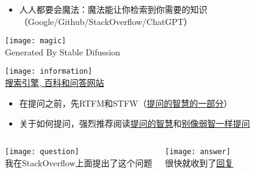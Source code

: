 \documentclass{ctexbeamer} %
\begin{document}
\begin{frame}
	\begin{itemize}
		\item 人人都要会魔法：魔法能让你检索到你需要的知识（Google/Github/StackOverflow/ChatGPT）
	\end{itemize}
	\begin{center}
		\texttt{[image: magic]}\\
		\small{Generated By Stable Difussion}
	\end{center}
\end{frame}

\begin{frame}
	\begin{center}
		\texttt{[image: information]}\\
		\small{\href{https://nju-projectn.github.io/ics-pa-gitbook/ics2020/\#\%E6\%90\%9C\%E7\%B4\%A2\%E5\%BC\%95\%E6\%93\%8E-\%E7\%99\%BE\%E7\%A7\%91\%E5\%92\%8C\%E9\%97\%AE\%E7\%AD\%94\%E7\%BD\%91\%E7\%AB\%99}{搜索引擎, 百科和问答网站}}
	\end{center}
	\begin{itemize}
		\item 在提问之前，先RTFM和STFW（\href{https://github.com/ryanhanwu/How-To-Ask-Questions-The-Smart-Way/blob/main/README-zh_CN.md\#rtfm-\%E5\%92\%8C-stfw\%E5\%A6\%82\%E4\%BD\%95\%E7\%9F\%A5\%E9\%81\%93\%E4\%BD\%A0\%E5\%B7\%B2\%E5\%AE\%8C\%E5\%85\%A8\%E6\%90\%9E\%E7\%A0\%B8\%E4\%BA\%86}{提问的智慧的一部分}）
		\item 关于如何提问，强烈推荐阅读\href{https://github.com/ryanhanwu/How-To-Ask-Questions-The-Smart-Way/blob/main/README-zh_CN.md}{提问的智慧}和\href{https://github.com/tangx/Stop-Ask-Questions-The-Stupid-Ways/blob/master/README.md}{别像弱智一样提问}
	\end{itemize}
\end{frame}

\begin{frame}
	\begin{columns}[T,onlytextwidth]
		\begin{center}
			\texttt{[image: question]}\\
			\small{我在StackOverflow上面提出了这个问题}
		\end{center}
		\begin{center}
			\texttt{[image: answer]}\\
			\small{很快就收到了\href{https://stackoverflow.com/questions/75851718/why-only-the-first-printf-is-outputed-to-the-terminal}{回复}}
		\end{center}
	\end{columns}
\end{frame}
\end{document}
